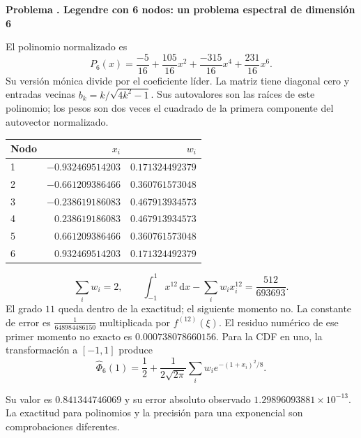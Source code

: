 \documentclass[11pt,a4paper]{article}
\newcommand{\dd}{\,\mathrm d}
\theoremstyle{definition}
\newcounter{problema}
\newenvironment{resuelto}[1]{\refstepcounter{problema}\par\medskip\Needspace{6\baselineskip}\textbf{Problema \theproblema. #1}\par}{\par\medskip}
\begin{document}
\begin{resuelto}{Legendre con 6 nodos: un problema espectral de dimensión 6}
El polinomio normalizado es
\[
P_{6}(x)=\frac{-5}{16}+\frac{105}{16}x^{2}+\frac{-315}{16}x^{4}+\frac{231}{16}x^{6}.
\]
Su versión mónica divide por el coeficiente líder. La matriz tiene diagonal cero y entradas vecinas $b_k=k/\sqrt{4k^2-1}$. Sus autovalores son las raíces de este polinomio; los pesos son dos veces el cuadrado de la primera componente del autovector normalizado.

\begin{center}\small\begin{tabular}{lrr}
\toprule
Nodo & $x_i$ & $w_i$\\\midrule
1 & $-0.932469514203$ & $0.171324492379$\\
2 & $-0.661209386466$ & $0.360761573048$\\
3 & $-0.238619186083$ & $0.467913934573$\\
4 & $0.238619186083$ & $0.467913934573$\\
5 & $0.661209386466$ & $0.360761573048$\\
6 & $0.932469514203$ & $0.171324492379$\\
\bottomrule\end{tabular}\end{center}

\[
\sum_iw_i=2,\qquad
\int_{-1}^1x^{12}\dd x-\sum_iw_ix_i^{12}
=\frac{512}{693693}.
\]
El grado $11$ queda dentro de la exactitud; el siguiente momento no. La constante de error es $\frac{1}{648984486150}$ multiplicada por $f^{(12)}(\xi)$. El residuo numérico de ese primer momento no exacto es $0.000738078660156$.
Para la CDF en uno, la transformación a $[-1,1]$ produce
\[
\widehat\Phi_{6}(1)=\frac12+
\frac1{2\sqrt{2\pi}}\sum_iw_i e^{-(1+x_i)^2/8}.
\]

Su valor es $0.841344746069$ y su error absoluto observado $1.29896093881\times10^{-13}$. La exactitud para polinomios y la precisión para una exponencial son comprobaciones diferentes.\end{resuelto}
\end{document}
